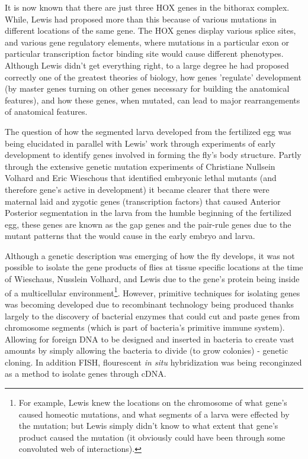 It is now known that there are just three HOX genes in the bithorax complex.  While, Lewis had proposed more than this because of various mutations in different locations of the same gene.  The HOX genes display various splice sites, and various gene regulatory elements, where mutations in a particular exon or particular transcription factor binding site would cause different phenotypes.  Although Lewis didn't get everything right, to a large degree he had proposed correctly one of the greatest theories of biology, how genes 'regulate' development (by master genes turning on other genes necessary for building the anatomical features), and how these genes, when mutated, can lead to major rearrangements of anatomical features. 

The question of how the segmented larva developed from the fertilized egg was being elucidated in parallel with Lewis' work through experiments of early development to identify genes involved in forming the fly's body structure.  Partly through the extensive genetic mutation experiments of Christiane Nullsein Volhard and Eric Wieschous that identified embryonic lethal mutants (and therefore gene's active in development) it became clearer that there were maternal laid and zygotic genes (transcription factors) that caused Anterior Posterior segmentation in the larva from the humble beginning of the fertilized egg, these genes are known as the gap genes and the pair-rule genes due to the mutant patterns that the would cause in the early embryo and larva\cite{pmid6776413}.  

Although a genetic description was emerging of how the fly develops, it was not possible to isolate the gene products of flies at tissue specific locations at the time of Wieschaus, Nusslein Volhard, and Lewis due to the gene's protein being inside of a multicellular environment\footnote{For example, Lewis knew the locations on the chromosome of what gene's caused homeotic mutations, and what segments of a larva were effected by the mutation; but Lewis simply didn't know to what extent that gene's product caused the mutation (it obviously could have been through some convoluted web of interactions).}.  However, primitive techniques for isolating genes was becoming developed due to recombinant technology being produced thanks largely to the discovery of bacterial enzymes that could cut and paste genes from chromosome segments (which is part of bacteria's primitive immune system).  Allowing for foreign DNA to be designed and inserted in bacteria to create vast amounts by simply allowing the bacteria to  divide (to grow colonies) - genetic cloning. In addition FISH, flourescent \textit{in situ} hybridization was being reconginzed as a method to isolate genes through cDNA.
 
